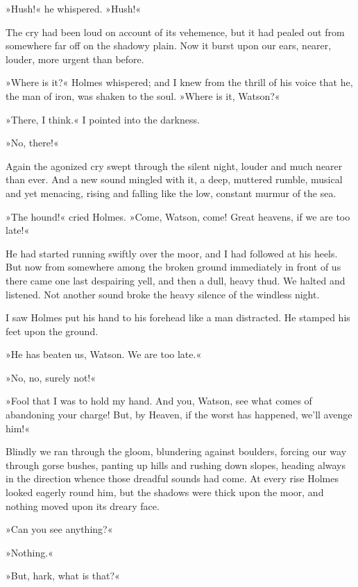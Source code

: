 »Hush!« he whispered. »Hush!«

The cry had been loud on account of its vehemence, but it had pealed out from somewhere far off on the shadowy plain. Now it burst upon our ears, nearer, louder, more urgent than before.

»Where is it?« Holmes whispered; and I knew from the thrill of his voice that he, the man of iron, was shaken to the soul. »Where is it, Watson?«

»There, I think.« I pointed into the darkness.

»No, there!«

Again the agonized cry swept through the silent night, louder and much nearer than ever. And a new sound mingled with it, a deep, muttered rumble, musical and yet menacing, rising and falling like the low, constant murmur of the sea.

»The hound!« cried Holmes. »Come, Watson, come! Great heavens, if we are too late!«

He had started running swiftly over the moor, and I had followed at his heels. But now from somewhere among the broken ground immediately in front of us there came one last despairing yell, and then a dull, heavy thud. We halted and listened. Not another sound broke the heavy silence of the windless night.

I saw Holmes put his hand to his forehead like a man distracted. He stamped his feet upon the ground.

»He has beaten us, Watson. We are too late.«

»No, no, surely not!«

»Fool that I was to hold my hand. And you, Watson, see what comes of abandoning your charge! But, by Heaven, if the worst has happened, we'll avenge him!«

Blindly we ran through the gloom, blundering against boulders, forcing our way through gorse bushes, panting up hills and rushing down slopes, heading always in the direction whence those dreadful sounds had come. At every rise Holmes looked eagerly round him, but the shadows were thick upon the moor, and nothing moved upon its dreary face.

»Can you see anything?«

»Nothing.«

»But, hark, what is that?«

